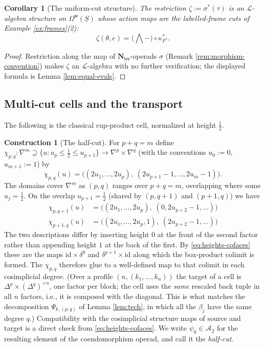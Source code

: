\documentclass[12pt]{amsart}
\newtheorem{corollary}[subsection]{Corollary}
\theoremstyle{definition}
\newtheorem{construction}[subsection]{Construction}
\theoremstyle{remark}
\newcommand{\id}{\mathrm{id}}
\newcommand{\Nl}{\mathbf{N}_{\mathsf{lev}}}
\newcommand{\uS}{\underline{S}}
\newcommand{\Omw}{\Omega^{\mathsf{w}}}           %
\newcommand{\Lop}{\mathcal{L}}                   %
\newcommand{\Aop}{\mathcal{A}}                   %
\begin{document}
\begin{corollary}[The uniform-cut structure]\label{cor:zeta}
The restriction $\zeta := \sigma^{*}(\tau)$ is an $\Lop$-algebra structure on $\Omw(\uS)$ whose action maps are the labelled-frame cuts of Example \ref{ex:frames}(2):
\[\zeta(\theta, e) = \big({\textstyle\bigwedge} - \big)\circ \kappa_{F^{e}}^{*}.\]
\end{corollary}

\begin{proof}
Restriction along the map of $\Nl$-operads $\sigma$ (Remark \ref{rem:morphism-convention}) makes $\zeta$ an $\Lop$-algebra with no further verification; the displayed formula is Lemma \ref{lem:equal-evals}.
\end{proof}

\subsection{Multi-cut cells and the transport}\label{sec:j-transport}

The following is the classical cup-product cell, normalized at height $\tfrac12$.

\begin{construction}[The half-cut]\label{con:halfcut}
For $p+q=m$ define $\chi_{p,q}\colon \nabla^m \supseteq \{u : u_p\leq \tfrac12 \leq u_{p+1}\} \to \nabla^p\times \nabla^q$ (with the conventions $u_0:=0$, $u_{m+1}:=1$) by
\[ \chi_{p,q}(u) = \big( (2u_1,\dots,2u_p),\; (2u_{p+1}-1,\dots,2u_m-1) \big). \]
The domains cover $\nabla^m$ as $(p,q)$ ranges over $p+q=m$, overlapping where some $u_j=\tfrac12$. On the overlap $u_{p+1}=\tfrac12$ (shared by $(p,q+1)$ and $(p+1,q)$) we have
\begin{align*}
\chi_{p,q+1}(u)   &= \big( (2u_1,\dots,2u_p),\; (0, 2u_{p+2}-1,\dots) \big) \\
\chi_{p+1,q}(u)   &= \big( (2u_1,\dots,2u_p, 1),\; (2u_{p+2}-1,\dots) \big)
\end{align*}
The two descriptions differ by inserting height $0$ at the front of the second factor rather than appending height $1$ at the back of the first. By \eqref{eq:heights-cofaces} these are the maps $\id\times \delta^{0}$ and $\delta^{p+1}\times \id$ along which the box-product colimit is formed. The $\chi_{p,q}$ therefore glue to a well-defined map to that colimit in each cosimplicial degree. (Over a profile $(n,(k_1,\dots,k_n))$ the target of a cell is $\Delta^{p}\times(\Delta^{q})^{\times n}$, one factor per block; the cell uses the \emph{same} rescaled back tuple in all $n$ factors, i.e., it is composed with the diagonal. This is what matches the decomposition $\Psi_{k,(p,q)}$ of Lemma \ref{lem:tech}, in which all the $\beta_j$ have the same degree $q$.) Compatibility with the cosimplicial structure maps of source and target is a direct check from \eqref{eq:heights-cofaces}. We write $\psi_0\in \Aop_2$ for the resulting element of the coendomorphism operad, and call it the \emph{half-cut}.
\end{construction}
\end{document}
